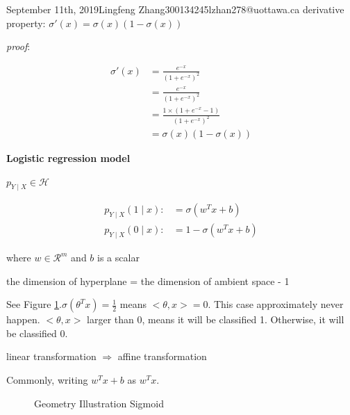 \documentclass{article}
\begin{document}
\begin{lecture}{September 11th, 2019}{Lingfeng Zhang}{300134245}{lzhan278@uottawa.ca}
derivative property: $\sigma'(x) = \sigma(x)(1-\sigma(x))$

\noindent \textit{proof}:

\begin{align*}
\sigma'(x) &= \frac{e ^{-x}}{(1+e ^{-x})^2}\\
&= \frac{e ^{-x}}{(1+e ^{-x})^2} \\
&= \frac{1 \times(1+e ^{-x}-1)}{(1+e ^{-x})^2} \\
&= \sigma(x)(1-\sigma(x))
\end{align*}

\textbf{Logistic regression model}

$p_{Y \mid X} \in \mathcal{H}$

\begin{align}
p_{Y \mid X}(1 \mid x) :&= \sigma(w^Tx+b) \\
p_{Y \mid X}(0 \mid x) :&=1- \sigma(w^Tx+b)
\end{align}

where $w \in \mathcal{R}^m$ and $b$ is a scalar

the dimension of hyperplane = the dimension of ambient space - 1 

See Figure \ref{fig:geometrySigmoid}.$\sigma(\theta^Tx)=\frac{1}{2}$ means $<\theta ,x> = 0$. This case approximately never happen. $< \theta ,x >$ larger than 0, means it will be classified 1. Otherwise, it will be classified 0.

linear transformation $\Rightarrow$ affine transformation

Commonly, writing $w^Tx+b$ as $w^Tx$.

\begin{figure}[ht!]
\centering
{}
\caption{Geometry Illustration Sigmoid}
\label{fig:geometrySigmoid}
\end{figure}


\end{lecture}
\end{document}
